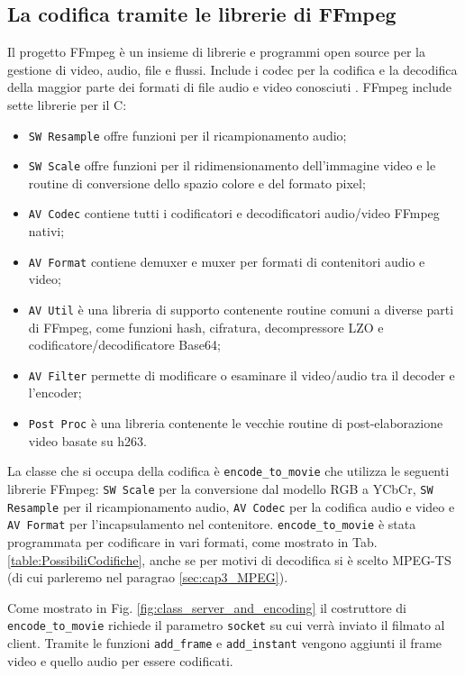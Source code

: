 \subsection{La codifica tramite le librerie di FFmpeg} \label{subsec:cap3_FFmpeg}
Il progetto FFmpeg è un insieme di librerie e programmi open source per la gestione di video, audio, file e flussi. Include i codec per la codifica e la decodifica della maggior parte dei formati di file audio e video conosciuti \parencite{FFmpeg_Documentation}. FFmpeg include sette librerie per il C:

\begin{itemize}
	\item \verb|SW Resample| offre funzioni per il ricampionamento audio;
	\item \verb|SW Scale| offre funzioni per il ridimensionamento dell'immagine video e le routine di conversione dello spazio colore e del formato pixel;
	\item \verb|AV Codec| contiene tutti i codificatori e decodificatori audio/video FFmpeg nativi;
	\item \verb|AV Format| contiene demuxer e muxer per formati di contenitori audio e video;
	\item \verb|AV Util| è una libreria di supporto contenente routine comuni a diverse parti di FFmpeg, come funzioni hash, cifratura, decompressore LZO e codificatore/decodificatore Base64;
	\item \verb|AV Filter| permette di modificare o esaminare il video/audio tra il decoder e l'encoder;
	\item \verb|Post Proc| è una libreria contenente le vecchie routine di post-elaborazione video basate su h263.
\end{itemize}

La classe che si occupa della codifica è \verb|encode_to_movie| che utilizza le seguenti librerie FFmpeg: \verb|SW Scale| per la conversione dal modello RGB a YCbCr, \verb|SW Resample| per il ricampionamento audio, \verb|AV Codec| per la codifica audio e video e \verb|AV Format| per l'incapsulamento nel contenitore. \verb|encode_to_movie| è stata programmata per codificare in vari formati, come mostrato in Tab. \ref{table:PossibiliCodifiche}, anche se per motivi di decodifica si è scelto MPEG-TS (di cui parleremo nel paragrao \ref{sec:cap3_MPEG}).

Come mostrato in Fig. \ref{fig:class_server_and_encoding} il costruttore di \verb|encode_to_movie| richiede il parametro \verb|socket| su cui verrà inviato il filmato al client. Tramite le funzioni \verb|add_frame| e \verb|add_instant| vengono aggiunti il frame video e quello audio per essere codificati.

